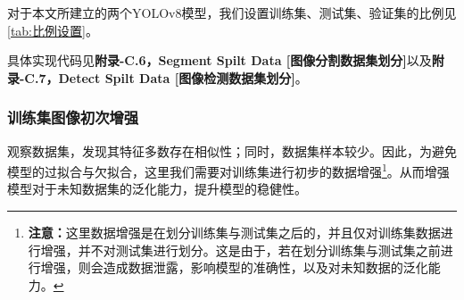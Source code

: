 \documentclass{MathorCupmodeling}
\begin{document}
	对于本文所建立的两个YOLOv8模型，我们设置训练集、测试集、验证集的比例见\textcolor{blue}{\cref{tab:比例设置}}。

\begin{table}[H]
	\centering
	\caption{模型训练集、测试集、验证集的划分比例}
	\label{tab:比例设置}
  \end{table}
  	具体实现代码见\textbf{附录-C.6，Segment Spilt Data [图像分割数据集划分]}以及\textbf{附录-C.7，Detect Spilt Data [图像检测数据集划分]}。
	\subsubsection{训练集图像初次增强}
	观察数据集，发现其特征多数存在相似性；同时，数据集样本较少。因此，为避免模型的过拟合与欠拟合，这里我们需要对训练集进行初步的数据增强\textcolor{blue}{\footnote{\textbf{注意：}这里数据增强是在划分训练集与测试集之后的，并且仅对训练集数据进行增强，并不对测试集进行划分。这是由于，若在划分训练集与测试集之前进行增强，则会造成数据泄露，影响模型的准确性，以及对未知数据的泛化能力。}}。从而增强模型对于未知数据集的泛化能力，提升模型的稳健性。
\end{document}
